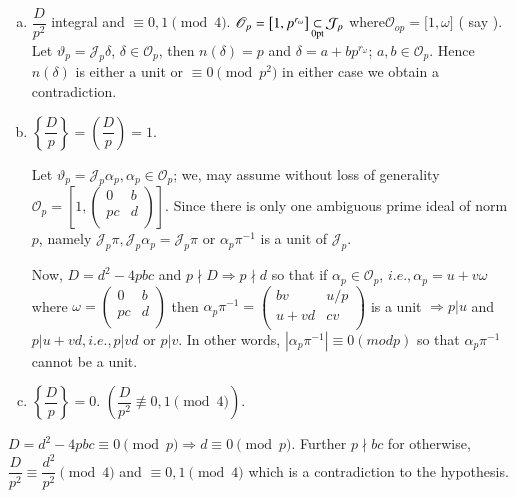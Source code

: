 \begin{enumerate}[a)]
\item $ \dfrac{D}{p^2} $ integral and  $ \equiv 0, 1  \pmod {4}$. $
  \mathscr{O}_p = \big [ 1, p^{r_\omega} \big ] \subs\limits_{\0pt}
  \mathcal{J}_p $ where\pageoriginale $ \mathscr{O}_{op} = \big[ 1, \omega \big ] $
  ( say ). Let $ \vartheta_p = \mathcal{J}_p \delta $, $ \delta \in
  \mathscr{O}_{p} $, then $ n ( \delta ) = p $ and  $ \delta = a +
  bp^{r_\omega} $; $ a, b \in \mathscr{O}_{p} $. Hence $ n (\delta) $
  is either a unit or $ \equiv 0 \pmod {p^2}$ in either case we
  obtain a contradiction. 
\item $ \left\{ \dfrac{D}{p} \right\} = \left(\dfrac{D}{p}\right) = 1 $. 

  Let $ \vartheta_p = \mathcal{J}_p \alpha_p, \alpha_p \in \mathscr{O}_p $; we,
  may assume without loss of generality $ \mathscr{O}_p = \left[
    1, \begin{pmatrix} 0 & b \\ pc & d \\ \end{pmatrix} \right]
  $. Since there is only one ambiguous prime ideal of norm $p$, namely
  $\mathcal{J}_p \pi,  \mathcal{J}_p \alpha_p = \mathcal{J}_p \pi $
  or $ \alpha_p \pi^{-1} $ is a unit of $ \mathcal{J}_p $.  
  
  Now,  $ D = d^2  -4 pbc $ and $ p \nmid D \Rightarrow p \nmid d $ so
  that if $ \alpha_p \in \mathscr{O}_p $, $ i.e., \alpha_p = u + v
  \omega $ where $ \omega = \begin{pmatrix} 0 & b \\ pc & d
    \\ \end{pmatrix} $ then $ \alpha_p \pi^{-1} = \begin{pmatrix} bv
    & u/p \\ u+vd & cv \\ \end{pmatrix} $ is a unit $ \Rightarrow  p |
  u $ and $ p | u + vd, i. e., p| vd $ or $ p | v $. In other words, $
  | \alpha_p \pi^{-1} | \equiv 0 ( mod p ) $ so that $ \alpha_p
  \pi^{-1} $ cannot be a unit.  
\item $ \left\{\dfrac{D}{p}\right\} = 0 $. $ \left( \dfrac{D}{p^2}
  \not \equiv 0, 1 \pmod 4 \right)$.
\end{enumerate}

$ D = d^2 - 4 pbc \equiv 0 \pmod p  \Rightarrow d \equiv 0 \pmod p 
$. Further $ p \nmid b c $ for otherwise, $ \dfrac{D}{p^2} \equiv
\dfrac{d^2}{p^2} \pmod 4 $ and  $ \equiv 0, 1 \pmod 4$ which is a
contradiction to the hypothesis. 

